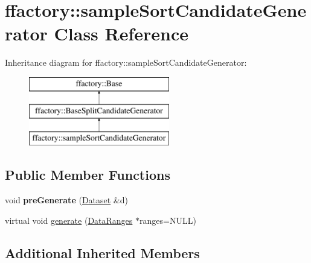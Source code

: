 \hypertarget{classffactory_1_1sample_sort_candidate_generator}{\section{ffactory\-:\-:sample\-Sort\-Candidate\-Generator Class Reference}
\label{classffactory_1_1sample_sort_candidate_generator}
}
Inheritance diagram for ffactory\-:\-:sample\-Sort\-Candidate\-Generator\-:\begin{figure}[H]
\begin{center}
\leavevmode
\includegraphics[height=3.000000cm]{classffactory_1_1sample_sort_candidate_generator}
\end{center}
\end{figure}
\subsection*{Public Member Functions}
\begin{DoxyCompactItemize}
\item 
\hypertarget{classffactory_1_1sample_sort_candidate_generator_a996b5ee78e3382fe7975a68e7c8a9a09}{void {\bfseries pre\-Generate} (\hyperlink{classffactory_1_1_dataset}{Dataset} \&d)}\label{classffactory_1_1sample_sort_candidate_generator_a996b5ee78e3382fe7975a68e7c8a9a09}

\item 
virtual void \hyperlink{classffactory_1_1sample_sort_candidate_generator_af620f5abce4a17d0a49d3e122ca6d0bc}{generate} (\hyperlink{classffactory_1_1_data_ranges}{Data\-Ranges} $\ast$ranges=N\-U\-L\-L)
\end{DoxyCompactItemize}
\subsection*{Additional Inherited Members}


